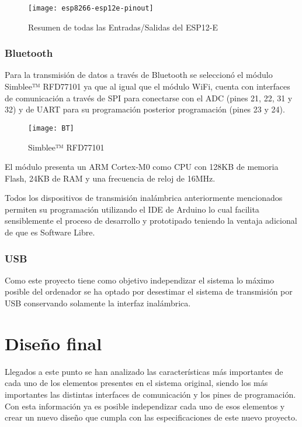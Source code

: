 \clearpage

\begin{figure} [h]
    \centering
    \texttt{[image: esp8266-esp12e-pinout]}
    \caption{Resumen de todas las Entradas/Salidas del ESP12-E\cite{ESP_Pinout}}
    \label{fig:ESP8266_pinout}
\end{figure}

\subsubsection{Bluetooth\label{sec:Bluetooth_N}}

Para la transmisión de datos a través de Bluetooth se seleccionó el módulo Simblee™ RFD77101 ya que al igual que el módulo WiFi, cuenta con interfaces de comunicación a través de \acrshort{SPI} para conectarse con el \acrshort{ADC} (pines 21, 22, 31 y 32) y de \acrshort{UART} para su programación posterior programación (pines 23 y 24).

\begin{figure} [H]
    \centering
    \texttt{[image: BT]}
    \caption{Simblee™ RFD77101}
    \label{fig:BT}
\end{figure}

El módulo presenta un ARM Cortex-M0 como \acrshort{CPU} con 128KB de memoria Flash, 24KB de \acrshort{RAM} y una frecuencia de reloj de 16MHz. 

Todos los dispositivos de transmisión inalámbrica anteriormente mencionados permiten su programación utilizando el \acrshort{IDE} de Arduino lo cual facilita sensiblemente el proceso de desarrollo y prototipado teniendo la ventaja adicional de que es Software Libre.


\subsubsection{USB\label{sec:USB_N}}


Como este proyecto tiene como objetivo independizar el sistema lo máximo posible del ordenador se ha optado por desestimar el sistema de transmisión por \acrshort{USB} conservando solamente la interfaz inalámbrica. 

\section{Diseño final\label{sec:Diseño_final}}
          
Llegados a este punto se han analizado las características más importantes de cada uno de los elementos presentes en el sistema original, siendo los más importantes las distintas interfaces de comunicación y los pines de programación.
\\Con esta información ya es posible independizar cada uno de esos elementos y crear un nuevo diseño que cumpla con las especificaciones de este nuevo proyecto.

